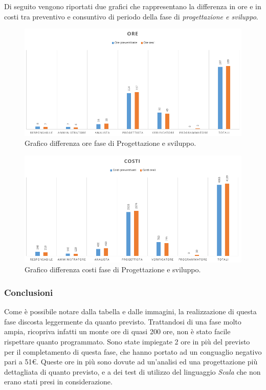 \documentclass[a4paper]{article}
\begin{document}
				Di seguito vengono riportati due grafici che rappresentano la differenza in ore e in costi tra preventivo e consuntivo di periodo della 
				fase di \emph{progettazione e sviluppo}.
				\begin{figure}[H]
					\centering
					\includegraphics[width=\textwidth]{diff_h_pr}
					\caption{Grafico differenza ore fase di Progettazione e sviluppo.}
				\end{figure}
				\begin{figure}[H]
					\centering
					\includegraphics[width=\textwidth]{diff_c_pr}
					\caption{Grafico differenza costi fase di Progettazione e sviluppo.}
				\end{figure}
				
					\subsubsection{Conclusioni}
                    Come è possibile notare dalla tabella e dalle immagini, la realizzazione di questa fase discosta leggermente da quanto previsto. Trattandosi di una fase 
                    molto ampia, ricopriva infatti un monte ore di quasi 200 ore, non è stato facile rispettare quanto programmato. Sono state impiegate 
                    2 ore in più del previsto per il completamento di questa fase, che hanno portato ad un conguaglio negativo pari a 51\euro.
                    Queste ore in più sono dovute ad un'analisi ed una progettazione più dettagliata di quanto previsto, e a dei test di utilizzo del 
                    linguaggio \emph{Scala} che non erano stati presi in considerazione. 
				
\end{document}
